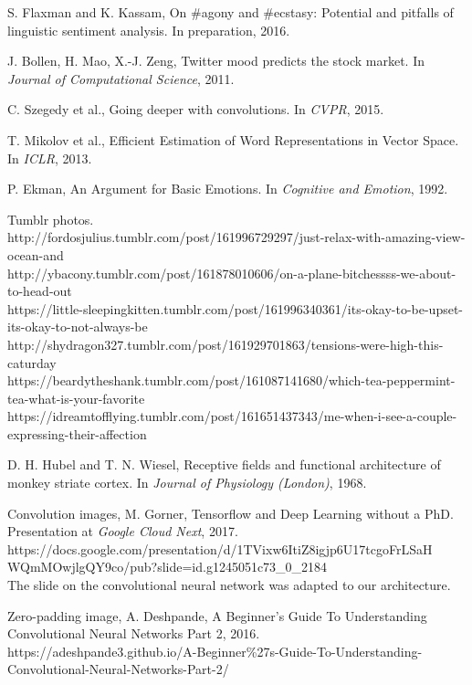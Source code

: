 \begin{thebibliography}{999}

S. Flaxman and K. Kassam, On \#agony and \#ecstasy: Potential and pitfalls of linguistic sentiment analysis. In preparation, 2016.

J. Bollen, H. Mao, X.-J. Zeng, Twitter mood predicts the stock market. In \textit{Journal of Computational Science}, 2011.

C. Szegedy et al., Going deeper with convolutions. In \textit{CVPR}, 2015.

T. Mikolov et al., Efficient Estimation of Word Representations in Vector Space. In \textit{ICLR}, 2013.

P. Ekman, An Argument for Basic Emotions. In \textit{Cognitive and Emotion}, 1992.

Tumblr photos.\\
http://fordosjulius.tumblr.com/post/161996729297/just-relax-with-amazing-view-ocean-and\\
http://ybacony.tumblr.com/post/161878010606/on-a-plane-bitchessss-we-about-to-head-out\\
https://little-sleepingkitten.tumblr.com/post/161996340361/its-okay-to-be-upset-its-okay-to-not-always-be\\
http://shydragon327.tumblr.com/post/161929701863/tensions-were-high-this-caturday\\
https://beardytheshank.tumblr.com/post/161087141680/which-tea-peppermint-tea-what-is-your-favorite\\
https://idreamtofflying.tumblr.com/post/161651437343/me-when-i-see-a-couple-expressing-their-affection

D. H. Hubel and T. N. Wiesel, Receptive fields and functional architecture of monkey striate cortex. In \textit{Journal of Physiology (London)}, 1968.

Convolution images, M. Gorner, Tensorflow and Deep Learning without a PhD. Presentation at \textit{Google Cloud Next}, 2017.\\ 
https://docs.google.com/presentation/d/1TVixw6ItiZ8igjp6U17tcgoFrLSaH\\WQmMOwjlgQY9co/pub?slide=id.g1245051c73\_0\_2184\\
The slide on the convolutional neural network was adapted to our architecture.

Zero-padding image, A. Deshpande, A Beginner's Guide To Understanding Convolutional Neural Networks Part 2, 2016. \\
https://adeshpande3.github.io/A-Beginner\%27s-Guide-To-Understanding-Convolutional-Neural-Networks-Part-2/


\end{thebibliography}
